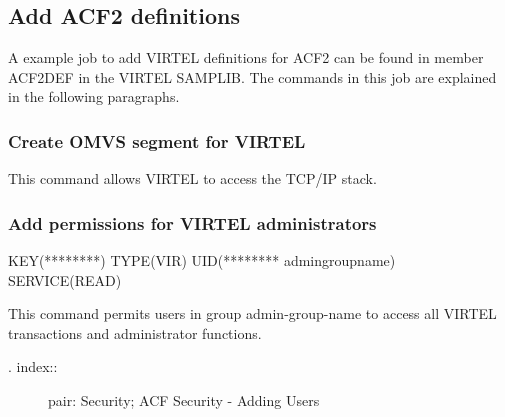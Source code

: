 \documentclass[letterpaper,10pt,english]{sphinxmanual}
\begin{document}
\subsection{Add ACF2 definitions}
\label{\detokenize{Installation_Guide:add-acf2-definitions}}
A example job to add VIRTEL definitions for ACF2 can be found in member ACF2DEF in the VIRTEL SAMPLIB. The commands in this job are explained in the following paragraphs.


\subsubsection{Create OMVS segment for VIRTEL}
\label{\detokenize{Installation_Guide:create-omvs-segment-for-virtel}}
\begin{sphinxVerbatim}[commandchars=\\\{\}]
  
    
\end{sphinxVerbatim}


This command allows VIRTEL to access the TCP/IP stack.


\subsubsection{Add permissions for VIRTEL administrators}
\label{\detokenize{Installation_Guide:add-permissions-for-virtel-administrators}}
\begin{sphinxVerbatim}[commandchars=\\\{\}]
\PYGZdl{}KEY(********) TYPE(VIR) UID(******** admin\PYGZhy{}group\PYGZhy{}name) SERVICE(READ)
\end{sphinxVerbatim}


This command permits users in group admin-group-name to access all VIRTEL transactions and administrator functions.
\begin{description}
\item[{. index::}] \leavevmode
pair: Security; ACF Security - Adding Users

\end{description}
\end{document}
